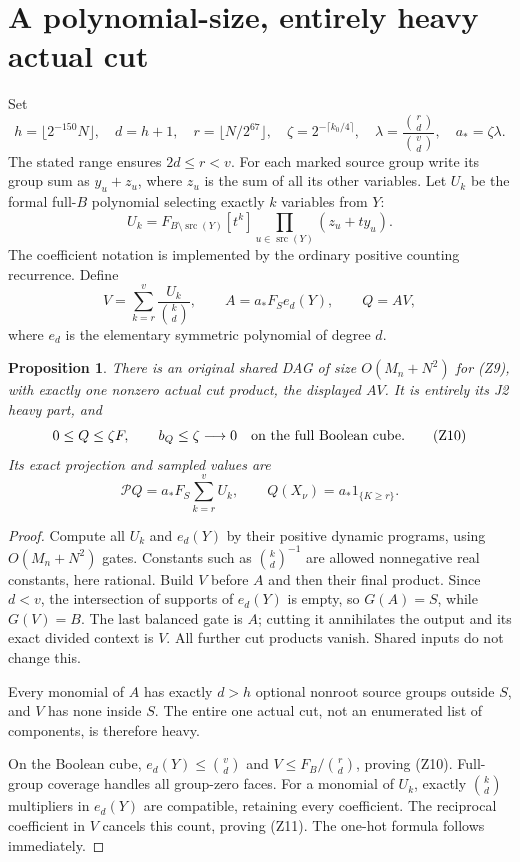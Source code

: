 \documentclass[11pt]{article}
\newtheorem{proposition}{Proposition}
\newcommand{\Pp}{\mathcal P}
\begin{document}
\section{A polynomial-size, entirely heavy actual cut}
Set
\[
 h=\lfloor2^{-150}N\rfloor,\quad d=h+1,\quad
 r=\lfloor N/2^{67}\rfloor,\quad
 \zeta=2^{-\lceil k_0/4\rceil},\quad
 \lambda=\frac{\binom rd}{\binom vd},\quad a_*=\zeta\lambda .
                                                               \tag{Z8}
\]
The stated range ensures $2d\le r<v$.
For each marked source group write its group sum as $y_u+z_u$,
where $z_u$ is the sum of all its other variables.
Let $U_k$ be the formal full-$B$ polynomial selecting exactly
$k$ variables from $Y$:
\[
 U_k=F_{B\setminus\operatorname{src}(Y)}
                         [t^k]\prod_{u\in\operatorname{src}(Y)}
                                      (z_u+t y_u).
\]
The coefficient notation is implemented by the ordinary positive
counting recurrence. Define
\[
 V=\sum_{k=r}^{v}\frac{U_k}{\binom kd},\qquad
 A=a_*F_S e_d(Y),\qquad Q=AV,                            \tag{Z9}
\]
where $e_d$ is the elementary symmetric polynomial of degree $d$.

\begin{proposition}
There is an original shared DAG of size $O(M_n+N^2)$ for (Z9),
with exactly one nonzero actual cut product, the displayed $AV$.
It is entirely its J2 heavy part, and
\[
              0\le Q\le\zeta F,\qquad b_Q\le\zeta\longrightarrow0
                        \quad\hbox{on the full Boolean cube}.  \tag{Z10}
\]
Its exact projection and sampled values are
\[
 \Pp Q=a_*F_S\sum_{k=r}^v U_k,\qquad
                         Q(X_\nu)=a_*1_{\{K\ge r\}}.     \tag{Z11}
\]
\end{proposition}
\begin{proof}
Compute all $U_k$ and $e_d(Y)$ by their positive dynamic programs,
using $O(M_n+N^2)$ gates. Constants such as $\binom kd^{-1}$
are allowed nonnegative real constants, here rational.
Build $V$ before $A$ and then their final product.
Since $d<v$, the intersection of supports of $e_d(Y)$ is empty,
so $G(A)=S$, while $G(V)=B$.
The last balanced gate is $A$; cutting it annihilates the output
and its exact divided context is $V$.
All further cut products vanish. Shared inputs do not change this.

Every monomial of $A$ has exactly $d>h$ optional nonroot source
groups outside $S$, and $V$ has none inside $S$. The entire one
actual cut, not an enumerated list of components, is therefore heavy.

On the Boolean cube, $e_d(Y)\le\binom vd$ and
$V\le F_B/\binom rd$, proving (Z10).
Full-group coverage handles all group-zero faces.
For a monomial of $U_k$, exactly $\binom kd$ multipliers in
$e_d(Y)$ are compatible, retaining every coefficient.
The reciprocal coefficient in $V$ cancels this count, proving
(Z11). The one-hot formula follows immediately.
\end{proof}
\end{document}
